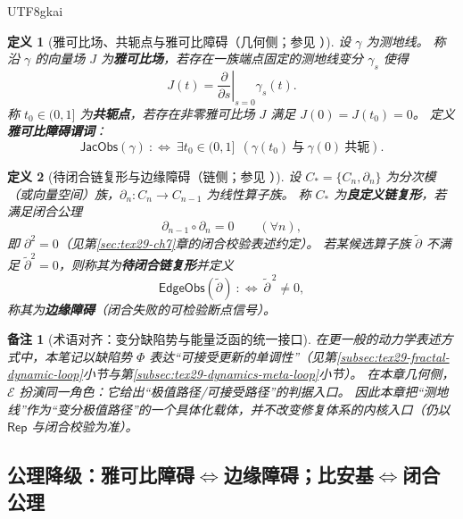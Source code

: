 \documentclass[12pt]{article}
\newtheorem{definition}{定义}[section]
\newtheorem{remark}{备注}[section]
\newcommand{\KouJing}{\texorpdfstring{表述约定}{表述约定}}
\begin{document}
\begin{CJK*}{UTF8}{gkai}
\begin{definition}[雅可比场、共轭点与雅可比障碍（几何侧；参见 \cite{Lee2018RiemannianManifolds,doCarmo1992Riemannian,
  Petersen2016RiemannianGeometry}）]
设 $\gamma$ 为测地线。
称沿 $\gamma$ 的向量场 $J$ 为\textbf{雅可比场}，若存在一族端点固定的测地线变分 $\gamma_s$ 使得
\[
  J(t)=\left.\frac{\partial}{\partial s}\right|_{s=0}\gamma_s(t).
\]
称 $t_0\in(0,1]$ 为\textbf{共轭点}，若存在非零雅可比场 $J$ 满足 $J(0)=J(t_0)=0$。
定义\textbf{雅可比障碍谓词}：
\[
  \mathsf{JacObs}(\gamma)\ :\Longleftrightarrow\ \exists t_0\in(0,1]\ \ (\gamma(t_0)\ \text{与}\ \gamma(0)\ \text{共轭}).
\]
\end{definition}

\begin{definition}[待闭合链复形与边缘障碍（链侧；参见 \cite{Hatcher2002AT,Weibel1994HomologicalAlgebra}）]
设 $C_*=\{C_n,\partial_n\}$ 为分次模（或向量空间）族，$\partial_n:C_n\to C_{n-1}$ 为线性算子族。
称 $C_*$ 为\textbf{良定义链复形}，若满足闭合公理
\[
  \partial_{n-1}\circ \partial_{n}=0\qquad (\forall n),
\]
即 $\partial^2=0$（见第\ref{sec:tex29-ch7}章的闭合校验\KouJing）。
若某候选算子族 $\widetilde{\partial}$ 不满足 $\widetilde{\partial}^2=0$，则称其为\textbf{待闭合链复形}并定义
\[
  \mathsf{EdgeObs}(\widetilde{\partial})\ :\Longleftrightarrow\ \widetilde{\partial}^{\,2}\neq 0,
\]
称其为\textbf{边缘障碍}（闭合失败的可检验断点信号）。
\end{definition}

\begin{remark}[术语对齐：变分缺陷势与能量泛函的统一接口]
在更一般的动力学表述方式中，本笔记以缺陷势 $\Phi$ 表达“可接受更新的单调性”（见第\ref{subsec:tex29-fractal-dynamic-loop}小节与第\ref{subsec:tex29-dynamics-meta-loop}小节）。
在本章几何侧，$\mathcal{E}$ 扮演同一角色：它给出“极值路径/可接受路径”的判据入口。
因此本章把“测地线”作为“变分极值路径”的一个具体化载体，并不改变修复体系的内核入口（仍以 $\mathsf{Rep}$ 与闭合校验为准）。
\end{remark}

\subsection{公理降级：雅可比障碍\texorpdfstring{$\Leftrightarrow$}{<->}边缘障碍；比安基\texorpdfstring{$\Leftrightarrow$}{<->}闭合公理}
\label{subsec:tex29-ch16-isomorphism}


\end{CJK*}
\end{document}
